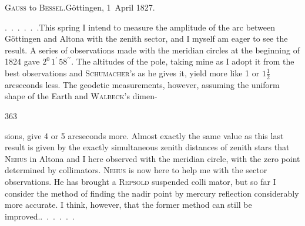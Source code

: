 \begin{center}
\textsc{Gauss} to \textsc{Bessel}.\quad Göttingen, 1~April 1827.
\end{center}

\par\noindent\hspace*{\parindent}.\ .\ .\ .\ .\ .\quad This spring I intend to measure the amplitude of the arc between
Göttingen and Altona with the zenith sector, and I myself am eager
to see the result. A series of observations made with the meridian circles at the beginning of
1824 gave \(2^{0}\,1^{\prime}\,58^{\prime\prime}\). The altitudes of the pole, taking mine as I adopt it from the
best observations and \textsc{Schumacher}'s as he gives it, yield
more like 1 or \(1\frac{1}{2}\) arcseconds less. The geodetic measurements, however,
assuming the uniform shape of the Earth and \textsc{Walbeck}'s dimen-
\par\clearpage
{}\hfill363\par\medskip
\noindent sions, give 4 or 5 arcseconds more. Almost exactly the same value as this
last result is given by the exactly simultaneous zenith distances of zenith stars
that \textsc{Nehus} in Altona and I here observed with the meridian circle, with
the zero point determined by collimators. \textsc{Nehus} is now here to help me
with the sector observations. He has brought a \textsc{Repsold} suspended colli\-%
mator, but so far I consider the method of finding the nadir point by
mercury reflection considerably more accurate. I think, however, that the former method
can still be improved.\quad.\ .\ .\ .\ .\ .
